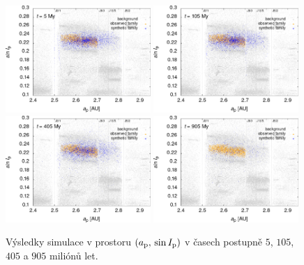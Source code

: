 \documentclass[A4paper, 12pt, oneside]{book}
\begin{document}
\immediate{}
\immediate{}
\immediate{}
\immediate{}
\begin{figure}
	\centering
	\includegraphics[width=0.49\textwidth]{obr/ai_5t.png}
	\includegraphics[width=0.49\textwidth]{obr/ai_105t.png}\\
	\includegraphics[width=0.49\textwidth]{obr/ai_405t.png}
	\includegraphics[width=0.49\textwidth]{obr/ai_905t.png}
	\caption{Výsledky simulace v prostoru $(a_{\rm p},\,\sin I_{\rm p})$ v časech postupně $5$, $105$, $405$ a $905$ miliónů let.} \label{fig:ai_sim}
\end{figure}
\end{document}

